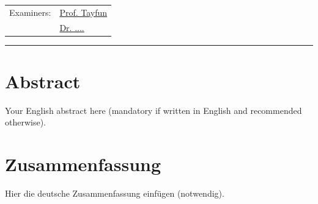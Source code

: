 \documentclass[12pt,final,twoside]{report}
\makeatletter
\newcommand{\trauthor}{Thang Le-Phuoc}
\newcommand{\trmatrikelnummer}{6543210}
\newcommand{\trgutachterA}{\href{mailto: @informatik.uni-hamburg.de}{Prof. Tayfun}}
\newcommand{\trgutachterB}{\href{mailto:@informatik.uni-hamburg.de}{Dr. ....}}
\theoremstyle{plain}
\theoremstyle{definition}
\theoremstyle{remark}
\makeatother
\begin{document}
\begin{titlepage}
\begin{center}
\begin{tabular}{ll}
    Examiners: & \trgutachterA \\
                   & \trgutachterB \\
    \end{tabular}
    \end{center}
    \vfill
    \rule{\textwidth}{0.4pt}
    \newpage 
\end{titlepage}

\thispagestyle{empty}
\hspace{1cm}
\newpage

\section*{Abstract}\label{sec:abstract}
Your English abstract here (mandatory if written in English and recommended otherwise).

\vfill
\section*{Zusammenfassung}\label{sec:zusammenfassung}
Hier die deutsche Zusammenfassung einf\"ugen (notwendig).

\cleardoublepage

\tableofcontents
\cleardoublepage
\listoffigures
\cleardoublepage
{}
\listoftables
\cleardoublepage
\end{document}
